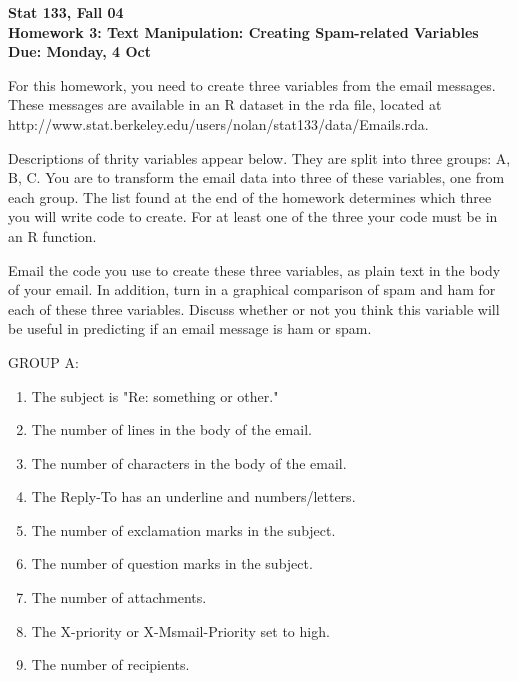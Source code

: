 \documentclass[12pt]{article}
\begin{document}
\parindent=0pt
\parskip=15pt

\textbf{
Stat 133, Fall 04 \\
Homework 3: Text Manipulation: Creating Spam-related Variables  \\
Due:  Monday, 4 Oct}

\medskip

For this homework, you need to create three variables from the 
email messages. These messages are available in an R dataset in
the rda file, located at 
\\
http://www.stat.berkeley.edu/users/nolan/stat133/data/Emails.rda.

Descriptions of thrity variables appear below.
They are split into three groups: A, B, C.
You are to transform the email data into three of these variables,
one from each group. 
The list found at the end of the homework determines
which three you will write code to create. 
For at least one of the three your code must be in an R function.

Email the code you use to create these three variables, as 
plain text in the body of your email. In addition, turn in
a graphical comparison of spam and ham for each of these
three variables.  Discuss whether or not you think this 
variable will be useful in predicting if an email message
is ham or spam.


GROUP A:
\begin{enumerate}
\item The subject is "Re: something or other."
\item The number of lines in the body of the email.
\item The number of characters in the body of the email.
\item The Reply-To has an underline and numbers/letters.
\item The number of exclamation marks in the subject.
\item The number of question marks in the subject.
\item  The number of attachments.
\item The X-priority or X-Msmail-Priority set to high.
\item The number of recipients.
\end{enumerate}
\end{document}
